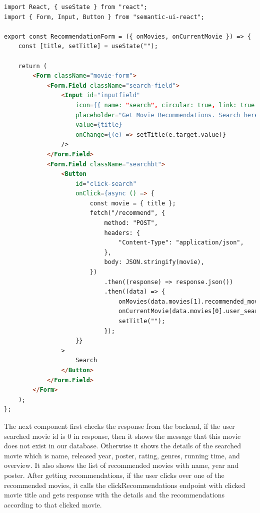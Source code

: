\begin{lstlisting}[language=HTML]
import React, { useState } from "react";
import { Form, Input, Button } from "semantic-ui-react";
 
export const RecommendationForm = ({ onMovies, onCurrentMovie }) => {
    const [title, setTitle] = useState("");
 
    return (
        <Form className="movie-form">
            <Form.Field className="search-field">
                <Input id="inputfield"
                    icon={{ name: "search", circular: true, link: true }}
                    placeholder="Get Movie Recommendations. Search here..."
                    value={title}
                    onChange={(e) => setTitle(e.target.value)}
                />
            </Form.Field>
            <Form.Field className="searchbt">
                <Button
                    id="click-search"
                    onClick={async () => {
                        const movie = { title };
                        fetch("/recommend", {
                            method: "POST",
                            headers: {
                                "Content-Type": "application/json",
                            },
                            body: JSON.stringify(movie),
                        })
                            .then((response) => response.json())
                            .then((data) => {
                                onMovies(data.movies[1].recommended_movies);
                                onCurrentMovie(data.movies[0].user_searched_movie_data);
                                setTitle("");
                            });
                    }}
                >
                    Search
                </Button>
            </Form.Field>
        </Form>
    );
};
\end{lstlisting}

The next component first checks the response from the backend, if the user searched movie id is 0 in response, then it shows the message that this movie does not exist in our database. Otherwise it shows the details of the searched movie which is name, released year, poster, rating, genres, running time, and overview. It also shows the list of recommended movies with name, year and poster. After getting recommendations, if the user clicks over one of the recommended movies, it calls the clickRecommendations endpoint with clicked movie title and gets response with the details and the recommendations according to that clicked movie. 

